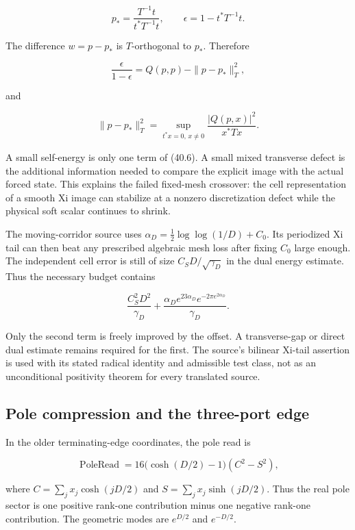 \documentclass[
  10pt,
  a4paper,
  10pt,
  oneside,
  openany]{book}
\begin{document}
\[
 p_* =\frac{T^{-1}t}{t^{*}T^{-1}t},
 \qquad \epsilon=1-t^{*}T^{-1}t.
\]

The difference \(w=p-p_*\) is \(T\)-orthogonal to \(p_*\). Therefore

\[
 \frac{\epsilon}{1-\epsilon}
 =Q(p,p)-\|p-p_*\|_T^2,
 \tag{40.6}\label{eq:40.6}
\]

and

\[
 \|p-p_*\|_T^2
 =\sup_{t^{*}x=0,\,x\ne0}
 \frac{|Q(p,x)|^2}{x^{*}Tx}.
 \tag{40.7}\label{eq:40.7}
\]

A small self-energy is only one term of (40.6). A small mixed transverse
defect is the additional information needed to compare the explicit
image with the actual forced state. This explains the failed fixed-mesh
crossover: the cell representation of a smooth Xi image can stabilize at
a nonzero discretization defect while the physical soft scalar continues
to shrink.

The moving-corridor source uses \(\alpha_D=\tfrac12\log\log(1/D)+C_0\).
Its periodized Xi tail can then beat any prescribed algebraic mesh loss
after fixing \(C_0\) large enough. The independent cell error is still
of size \(C_SD/\sqrt{\gamma_D}\) in the dual energy estimate. Thus the
necessary budget contains

\[
 \frac{C_S^2D^2}{\gamma_D}
 +\frac{\alpha_De^{23\alpha_D}e^{-2\pi e^{2\alpha_D}}}{\gamma_D}.
 \tag{40.8}\label{eq:40.8}
\]

Only the second term is freely improved by the offset. A transverse-gap
or direct dual estimate remains required for the first. The source's
bilinear Xi-tail assertion is used with its stated radical identity and
admissible test class, not as an unconditional positivity theorem for
every translated source.

\subsection{Pole compression and the three-port
edge}\label{pole-compression-and-the-three-port-edge}

In the older terminating-edge coordinates, the pole read is

\[
 \operatorname{PoleRead}
 =16\bigl(\cosh(D/2)-1\bigr)(C^2-S^2),
\]

where \(C=\sum_jx_j\cosh(jD/2)\) and \(S=\sum_jx_j\sinh(jD/2)\). Thus
the real pole sector is one positive rank-one contribution minus one
negative rank-one contribution. The geometric modes are \(e^{D/2}\) and
\(e^{-D/2}\).
\end{document}
